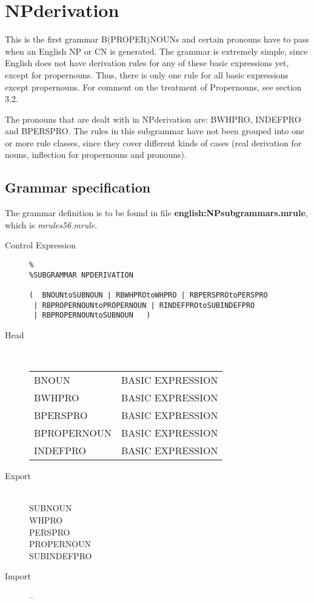 \newpage
\section{NPderivation}
This is the first grammar B(PROPER)NOUNs and certain pronouns have to pass 
when an English NP or CN is 
generated. The grammar is extremely simple, since English does not have 
derivation rules for any of these basic expressions yet, except for 
propernouns. Thus, there is only 
one rule for all basic expressions except propernouns. For comment on 
the treatment of Propernouns, see section 3.2.

The pronouns that are dealt with in 
NPderivation are: BWHPRO, INDEFPRO and BPERSPRO. The rules in this subgrammar 
have not been grouped into one or more rule classes, since
they cover different kinds of cases (real 
derivation for nouns, inflection for propernouns and pronouns). 

\subsection{Grammar specification}
The grammar definition is to be found in file {\bf 
english:NPsubgrammars.mrule}, which is {\em mrules56.mrule\/}.

\begin{description}
\item[Control Expression] \mbox{}
   \begin{verbatim}
%
%SUBGRAMMAR NPDERIVATION

(  BNOUNtoSUBNOUN | RBWHPROtoWHPRO | RBPERSPROtoPERSPRO
 | RBPROPERNOUNtoPROPERNOUN | RINDEFPROtoSUBINDEFPRO 
 | RBPROPERNOUNtoSUBNOUN   )

   \end{verbatim}

\item[Head] \mbox{}\\
\begin{tabular}{ll}
BNOUN         & BASIC EXPRESSION \\
BWHPRO        & BASIC EXPRESSION \\
BPERSPRO      & BASIC EXPRESSION \\
BPROPERNOUN   & BASIC EXPRESSION \\
INDEFPRO      & BASIC EXPRESSION 
\end{tabular}

\item[Export]  \mbox{}\\
SUBNOUN \\
WHPRO \\
PERSPRO \\
PROPERNOUN \\
SUBINDEFPRO

\item[Import] --
\end{description}

